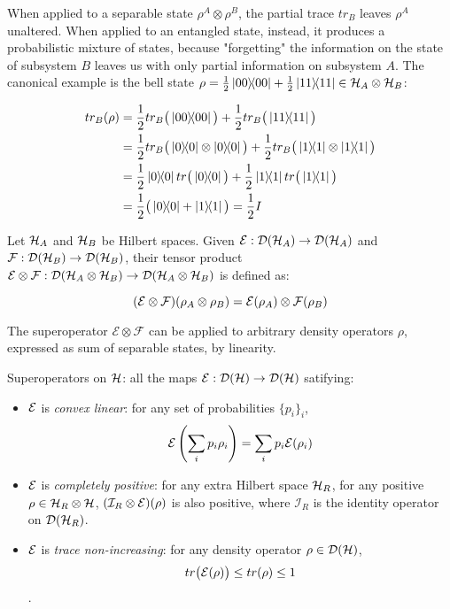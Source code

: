 When applied to a separable state $\rho^A \otimes \rho^B$, the partial trace $tr_B$ leaves $\rho^A$ unaltered. When applied to an entangled state, instead, it produces a probabilistic mixture of states, because "forgetting" the information on the state of subsystem $B$ leaves us with only partial information on subsystem $A$. The canonical example is the bell state $\rho = \frac{1}{2} \ket{00}\!\!\bra{00} + \frac{1}{2}\ket{11}\!\!\bra{11} \in \mathcal{H}_A \otimes \mathcal{H}_B$: 

\begin{align*}
tr_B(\rho) &= \frac{1}{2} tr_B\big(\proj{00}\big) + \frac{1}{2}tr_B\big(\proj{11}\big)  \\
	&= \frac{1}{2} tr_B\big(\proj{0}\otimes\proj{0}\big) + \frac{1}{2}tr_B\big(\proj{1}\otimes\proj{1}\big) \\
	&= \frac{1}{2} \proj{0}tr\big(\proj{0}\big) + \frac{1}{2}\proj{1}tr\big(\proj{1}\big) \\
	&= \frac{1}{2} \big(\proj{0} + \proj{1}\big) = \frac{1}{2}I
\end{align*}


Let $\mathcal{H}_A$ and $\mathcal{H}_B$ be Hilbert spaces. Given $\mathcal{E}: \mathcal{D}(\mathcal{H}_A) \rightarrow \mathcal{D}(\mathcal{H}_A)$ and $\mathcal{F}: \mathcal{D}(\mathcal{H}_B) \rightarrow \mathcal{D}(\mathcal{H}_B)$,  their tensor product $\mathcal{E}\otimes \mathcal{F}: \mathcal{D}(\mathcal{H}_A \otimes \mathcal{H}_B)\rightarrow \mathcal{D}(\mathcal{H}_A \otimes \mathcal{H}_B)$ is defined as:

\[
	(\mathcal{E} \otimes \mathcal{F})(\rho_A \otimes \rho_B) = \mathcal{E}(\rho_A)\otimes \mathcal{F}(\rho_B)
\]

The superoperator $\mathcal{E} \otimes \mathcal{F}$ can be applied to arbitrary density operators $\rho$, expressed as sum of separable states, by linearity.


Superoperators on $\mathcal{H}$: all the maps $\mathcal{E}: \mathcal{D}(\mathcal{H}) \rightarrow \mathcal{D}(\mathcal{H})$ satifying:
\begin{itemize}
\item $\mathcal{E}$ is \textit{convex linear}: for any set of probabilities	$\{p_i\}_i$,
\[\mathcal{E}\left(\sum_i p_i \rho_i \right) = \sum_i p_i \mathcal{E}(\rho_i)\]
\item $\mathcal{E}$ is \textit{completely positive}: for any extra Hilbert space $\mathcal{H}_R$, for any positive $\rho \in \mathcal{H}_R \otimes \mathcal{H}$, $(\mathcal{I}_R\otimes \mathcal{E})(\rho)$ is also positive, where $\mathcal{I}_R$ is the identity operator on $\mathcal{D}(\mathcal{H}_R)$.
\item $\mathcal{E}$ is \textit{trace non-increasing}: for any density operator $\rho \in \mathcal{D}(\mathcal{H})$, 
\[tr\big(\mathcal{E}(\rho)\big) \leq tr(\rho) \leq 1\].
\end{itemize}

